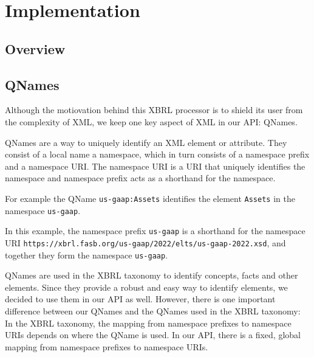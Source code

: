 \chapter{Implementation}
\label{sec:implementation}

\section{Overview}

\section{QNames}

Although the motiovation behind this XBRL processor is to shield its user from the complexity of XML, 
we keep one key aspect of XML in our API: QNames.

QNames are a way to uniquely identify an XML element or attribute. 
They consist of a local name a namespace, which in turn consists of a namespace prefix and a namespace URI. 
The namespace URI is a URI that uniquely identifies the namespace and namespace prefix acts as a shorthand for the namespace.

For example the QName \texttt{us-gaap:Assets} identifies the element \texttt{Assets} in the namespace \texttt{us-gaap}.

In this example, the namespace prefix \texttt{us-gaap} is a shorthand for the namespace URI \texttt{https://xbrl.fasb.org/us-gaap/2022/elts/us-gaap-2022.xsd}, 
and together they form the namespace \texttt{us-gaap}.

QNames are used in the XBRL taxonomy to identify concepts, facts and other elements. Since they provide a robust and easy way to identify elements,
we decided to use them in our API as well. However, there is one important difference between our QNames and the QNames used in the XBRL taxonomy:
In the XBRL taxonomy, the mapping from namespace prefixes to namespace URIs depends on where the QName is used. 
In our API, there is a fixed, global mapping from namespace prefixes to namespace URIs.





